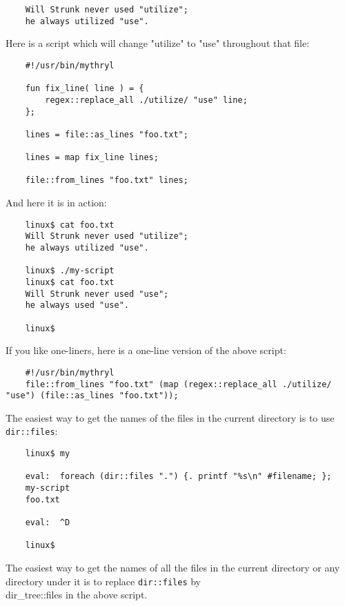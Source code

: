 \begin{verbatim}
    Will Strunk never used "utilize";
    he always utilized "use".
\end{verbatim}

Here is a script which will change "utilize" to "use" 
throughout that file: 

\begin{verbatim}
    #!/usr/bin/mythryl

    fun fix_line( line ) = {
        regex::replace_all ./utilize/ "use" line;
    };

    lines = file::as_lines "foo.txt";

    lines = map fix_line lines;

    file::from_lines "foo.txt" lines;
\end{verbatim}

And here it is in action:

\begin{verbatim}
    linux$ cat foo.txt
    Will Strunk never used "utilize";
    he always utilized "use".

    linux$ ./my-script
    linux$ cat foo.txt
    Will Strunk never used "use";
    he always used "use".

    linux$
\end{verbatim}

If you like one-liners, here is a one-line version of the above script:

\begin{verbatim}
    #!/usr/bin/mythryl
    file::from_lines "foo.txt" (map (regex::replace_all ./utilize/ "use") (file::as_lines "foo.txt"));
\end{verbatim}

The easiest way to get the names of the files in the current 
directory is to use {\tt dir::files}:

\begin{verbatim}
    linux$ my

    eval:  foreach (dir::files ".") {. printf "%s\n" #filename; };
    my-script
    foo.txt

    eval:  ^D

    linux$
\end{verbatim}

The easiest way to get the names of all the files in the 
current directory or any directory under it is to replace 
{\tt dir::files} by {\\dir\_tree::files} in the above script.

\cutend*


